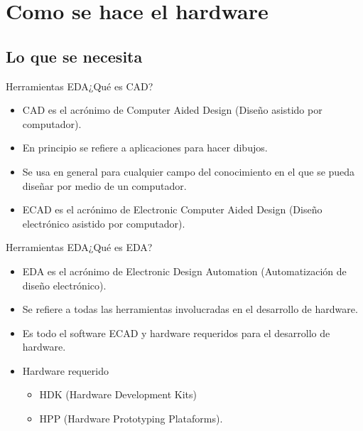 \documentclass{beamer}
\begin{document}

\section{Como se hace el hardware}

\subsection{Lo que se necesita}

\begin{frame}{Herramientas EDA}{¿Qué es CAD?}
  \begin{itemize}
  \item CAD es el acrónimo de Computer Aided Design (Diseño asistido por computador).
  \item En principio se refiere a aplicaciones para hacer dibujos.
  \item Se usa en general para cualquier campo del conocimiento en el que se pueda diseñar por medio de un computador.
  \item ECAD es el acrónimo de Electronic Computer Aided Design (Diseño electrónico asistido por computador).
  \end{itemize}
\end{frame}

\begin{frame}{Herramientas EDA}{¿Qué es EDA?}
  \begin{itemize}
  \item EDA es el acrónimo de Electronic Design Automation (Automatización de diseño electrónico).
  \item Se refiere a todas las herramientas involucradas en el desarrollo de hardware.
  \item Es todo el software ECAD y hardware requeridos para el desarrollo de hardware.
  \item Hardware requerido
    \begin{itemize}
    \item HDK (Hardware Development Kits)
    \item HPP (Hardware Prototyping Plataforms).
    \end{itemize}
  \end{itemize}
\end{frame}
\end{document}
